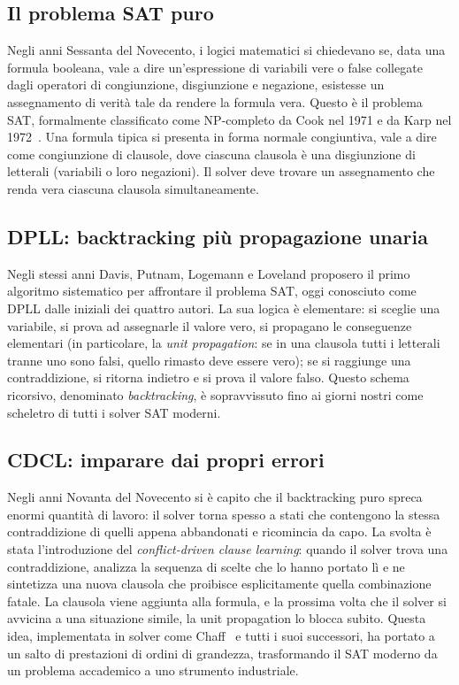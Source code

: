 \subsection{Il problema SAT puro}

Negli anni Sessanta del Novecento, i logici matematici si
chiedevano se, data una formula booleana, vale a dire
un'espressione di variabili vere o false collegate dagli
operatori di congiunzione, disgiunzione e negazione,
esistesse un assegnamento di verit\`a tale da rendere la
formula vera. Questo \`e il problema SAT, formalmente
classificato come NP-completo da Cook nel 1971 e da
Karp nel 1972~\parencite{garey1979}. Una formula tipica si
presenta in forma normale congiuntiva, vale a dire come
congiunzione di clausole, dove ciascuna clausola \`e una
disgiunzione di letterali (variabili o loro negazioni). Il
solver deve trovare un assegnamento che renda vera ciascuna
clausola simultaneamente.

\subsection{DPLL: backtracking pi\`u propagazione unaria}

Negli stessi anni Davis, Putnam, Logemann e Loveland
proposero il primo algoritmo sistematico per affrontare il
problema SAT, oggi conosciuto come DPLL dalle iniziali dei
quattro autori. La sua logica \`e elementare: si sceglie una
variabile, si prova ad assegnarle il valore vero, si
propagano le conseguenze elementari (in particolare, la
\emph{unit propagation}: se in una clausola tutti i
letterali tranne uno sono falsi, quello rimasto deve
essere vero); se si raggiunge una contraddizione, si
ritorna indietro e si prova il valore falso. Questo
schema ricorsivo, denominato \emph{backtracking}, \`e
sopravvissuto fino ai giorni nostri come scheletro di tutti
i solver SAT moderni.

\subsection{CDCL: imparare dai propri errori}

Negli anni Novanta del Novecento si \`e capito che il
backtracking puro spreca enormi quantit\`a di lavoro: il
solver torna spesso a stati che contengono la stessa
contraddizione di quelli appena abbandonati e ricomincia da
capo. La svolta \`e stata l'introduzione del
\emph{conflict-driven clause learning}: quando il solver
trova una contraddizione, analizza la sequenza di scelte che
lo hanno portato l\`i e ne sintetizza una nuova clausola che
proibisce esplicitamente quella combinazione fatale. La
clausola viene aggiunta alla formula, e la prossima volta
che il solver si avvicina a una situazione simile, la
unit propagation lo blocca subito. Questa idea, implementata
in solver come Chaff~\parencite{moskewicz2001} e tutti i
suoi successori, ha portato a un salto di prestazioni di
ordini di grandezza, trasformando il SAT moderno da un
problema accademico a uno strumento industriale.

